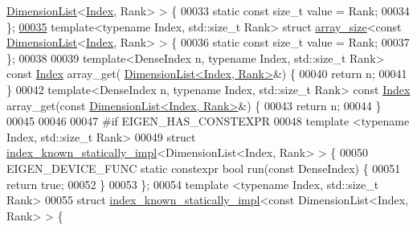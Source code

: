 \begin{DoxyCode}
      \hyperlink{struct_eigen_1_1_dimension_list}{DimensionList}<\hyperlink{namespace_eigen_a62e77e0933482dafde8fe197d9a2cfde}{Index}, Rank> > \{
00033   \textcolor{keyword}{static} \textcolor{keyword}{const} \textcolor{keywordtype}{size\_t} value = Rank;
00034 \};
\hyperlink{struct_eigen_1_1internal_1_1array__size_3_01const_01_dimension_list_3_01_index_00_01_rank_01_4_01_4}{00035} \textcolor{keyword}{template}<\textcolor{keyword}{typename} Index, std::\textcolor{keywordtype}{size\_t} Rank> \textcolor{keyword}{struct }\hyperlink{struct_eigen_1_1internal_1_1array__size}{array\_size}<const 
      \hyperlink{struct_eigen_1_1_dimension_list}{DimensionList}<\hyperlink{namespace_eigen_a62e77e0933482dafde8fe197d9a2cfde}{Index}, Rank> > \{
00036   \textcolor{keyword}{static} \textcolor{keyword}{const} \textcolor{keywordtype}{size\_t} value = Rank;
00037 \};
00038 
00039 \textcolor{keyword}{template}<DenseIndex n, \textcolor{keyword}{typename} Index, std::\textcolor{keywordtype}{size\_t} Rank> \textcolor{keyword}{const} \hyperlink{namespace_eigen_a62e77e0933482dafde8fe197d9a2cfde}{Index} array\_get(
      \hyperlink{struct_eigen_1_1_dimension_list}{DimensionList<Index, Rank>}&) \{
00040   \textcolor{keywordflow}{return} n;
00041 \}
00042 \textcolor{keyword}{template}<DenseIndex n, \textcolor{keyword}{typename} Index, std::\textcolor{keywordtype}{size\_t} Rank> \textcolor{keyword}{const} \hyperlink{namespace_eigen_a62e77e0933482dafde8fe197d9a2cfde}{Index} array\_get(\textcolor{keyword}{const} 
      \hyperlink{struct_eigen_1_1_dimension_list}{DimensionList<Index, Rank>}&) \{
00043   \textcolor{keywordflow}{return} n;
00044 \}
00045 
00046 
00047 \textcolor{preprocessor}{#if EIGEN\_HAS\_CONSTEXPR}
00048 \textcolor{keyword}{template} <\textcolor{keyword}{typename} Index, std::\textcolor{keywordtype}{size\_t} Rank>
00049 \textcolor{keyword}{struct }\hyperlink{struct_eigen_1_1internal_1_1index__known__statically__impl}{index\_known\_statically\_impl}<DimensionList<Index, Rank> > \{
00050   EIGEN\_DEVICE\_FUNC \textcolor{keyword}{static} constexpr \textcolor{keywordtype}{bool} run(\textcolor{keyword}{const} DenseIndex) \{
00051     \textcolor{keywordflow}{return} \textcolor{keyword}{true};
00052   \}
00053 \};
00054 \textcolor{keyword}{template} <\textcolor{keyword}{typename} Index, std::\textcolor{keywordtype}{size\_t} Rank>
00055 \textcolor{keyword}{struct }\hyperlink{struct_eigen_1_1internal_1_1index__known__statically__impl}{index\_known\_statically\_impl}<const DimensionList<Index, Rank> > \{

\end{DoxyCode}
